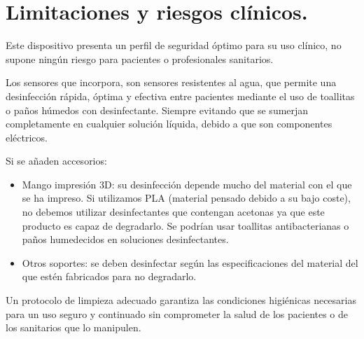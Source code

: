 \section{Limitaciones y riesgos clínicos.}
Este dispositivo presenta un perfil de seguridad óptimo para su uso clínico, no supone ningún riesgo para pacientes o profesionales sanitarios. 

Los sensores que incorpora, son sensores resistentes al agua, que permite una desinfección rápida, óptima y efectiva entre pacientes mediante el uso de toallitas o paños húmedos con desinfectante. Siempre evitando que se sumerjan completamente en cualquier solución líquida, debido a que son componentes eléctricos.

Si se añaden accesorios:
\begin{itemize}
    \item Mango impresión 3D: su desinfección depende mucho del material con el que se ha impreso. Si utilizamos PLA (material pensado debido a su bajo coste), no debemos utilizar desinfectantes que contengan acetonas ya que este producto es capaz de degradarlo. Se podrían usar toallitas antibacterianas o paños humedecidos en soluciones desinfectantes.
    \item Otros soportes: se deben desinfectar según las especificaciones del material del que estén fabricados para no degradarlo.  
\end{itemize}

Un protocolo de limpieza adecuado garantiza las condiciones higiénicas necesarias para un uso seguro y continuado sin comprometer la salud de los pacientes o de los sanitarios que lo manipulen.
